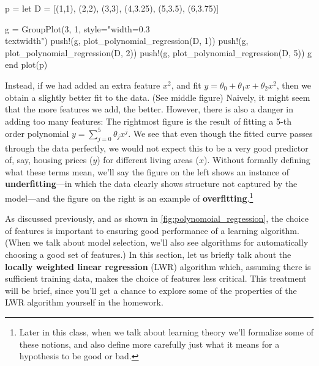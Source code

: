 \begin{figure*}
    \caption{
        \label{fig:polynomoial_regression} Polynomial regression with different $k$-order fits.
    }
    \begin{jlcode}
    p = let
        D = [(1,1), (2,2), (3,3), (4,3.25), (5,3.5), (6,3.75)]

        g = GroupPlot(3, 1, style="width=0.3\\textwidth")
        push!(g, plot_polynomial_regression(D, 1))
        push!(g, plot_polynomial_regression(D, 2))
        push!(g, plot_polynomial_regression(D, 5))
        g
    end
    plot(p)
    \end{jlcode}
    \begin{center}
    \end{center}
\end{figure*}

Instead, if we had added an extra feature $x^2$, and fit $y = \theta_0 + \theta_1 x + \theta_2 x^2$,
then we obtain a slightly better fit to the data. (See middle figure) Naively, it
might seem that the more features we add, the better. However, there is also
a danger in adding too many features: The rightmost figure is the result of
fitting a 5-th order polynomial $y = \sum_{j=0}^5 \theta_j x^j$. We see that even though the
fitted curve passes through the data perfectly, we would not expect this to
be a very good predictor of, say, housing prices ($y$) for different living areas
($x$). Without formally defining what these terms mean, we'll say the figure
on the left shows an instance of \textbf{underfitting}---in which the data clearly
shows structure not captured by the model---and the figure on the right is
an example of \textbf{overfitting}.\footnote{Later in this class, when we talk about learning
theory we'll formalize some of these notions, and also define more carefully
just what it means for a hypothesis to be good or bad.} %

As discussed previously, and as shown in \cref{fig:polynomoial_regression}, the choice of %
features is important to ensuring good performance of a learning algorithm.
(When we talk about model selection, we'll also see algorithms for automatically
choosing a good set of features.) In this section, let us briefly talk
about the \textbf{locally weighted linear regression} (LWR) algorithm which, assuming
there is sufficient training data, makes the choice of features less critical.
This treatment will be brief, since you'll get a chance to explore some of the
properties of the LWR algorithm yourself in the homework.


